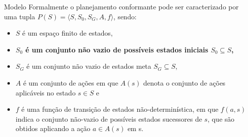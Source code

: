 % 
% 


\begin{frame}{Modelo}
    Formalmente o planejamento conformante pode ser caracterizado por uma tupla 
    $P(S) =\langle S, S_0, S_G, A, f \rangle$, sendo:
    \begin{itemize}
        \item $S$ é um espaço finito de estados,
        \item \textbf{ $S_0$ é um conjunto não vazio de possíveis estados iniciais $S_0\subseteq 
        S$,}
        \item $S_G$ é um conjunto não vazio de estados meta $S_G \subseteq S$,
        \item $A$ é um conjunto de ações em que $A(s)$ denota o conjunto de ações 
        aplicáveis no estado $s \in S$ e
        \item $f$ é uma função de transição de estados não-determinística, em que 
        $f(a,s)$ indica o conjunto não-vazio de possíveis estados sucessores de $s$, que 
        são obtidos aplicando a ação $a \in A(s)$ em s.
    \end{itemize}
\end{frame}


